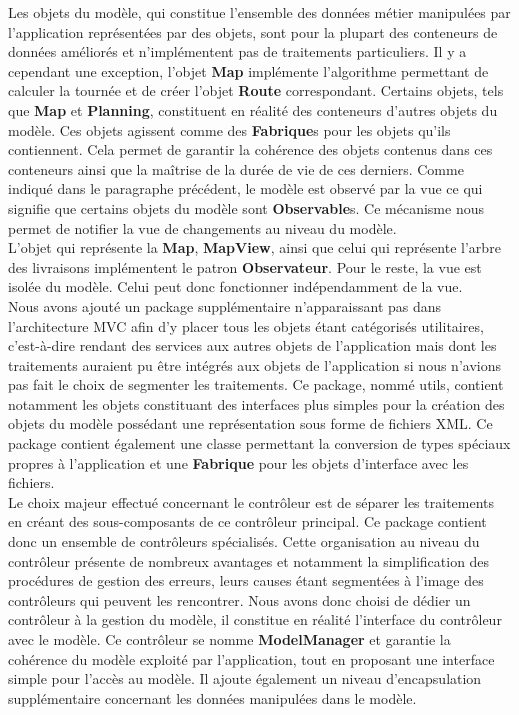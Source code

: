 \documentclass[paper=a4, fontsize=11pt]{report}
\numberwithin{equation}{section}		%
\numberwithin{figure}{section}		%
\numberwithin{table}{section}		%
\renewcommand{\bf}[1]{\textbf{#1}}
\begin{document}
Les objets du modèle, qui constitue l'ensemble des données métier manipulées par l'application représentées par des objets, sont pour la plupart des conteneurs de données améliorés et n'implémentent pas de traitements particuliers. Il y a cependant une exception, l'objet \bf{Map} implémente l'algorithme permettant de calculer la tournée et de créer l'objet \bf{Route} correspondant. Certains objets, tels que \bf{Map} et \bf{Planning}, constituent en réalité des conteneurs d'autres objets du modèle. Ces objets agissent comme des \bf{Fabrique}s pour les objets qu'ils contiennent. Cela permet de garantir la cohérence des objets contenus dans ces conteneurs ainsi que la maîtrise de la durée de vie de ces derniers. Comme indiqué dans le paragraphe précédent, le modèle est observé par la vue ce qui signifie que certains objets du modèle sont \bf{Observable}s. Ce mécanisme nous permet de notifier la vue de changements au niveau du modèle. \\

L'objet qui représente la \bf{Map}, \bf{MapView}, ainsi que celui qui représente l'arbre des livraisons implémentent le patron \bf{Observateur}. Pour le reste, la vue est isolée du modèle. Celui peut donc fonctionner indépendamment de la vue.\\

Nous avons ajouté un package supplémentaire n'apparaissant pas dans l'architecture MVC afin d'y placer tous les objets étant catégorisés utilitaires, c'est-à-dire rendant des services aux autres objets de l'application mais dont les traitements auraient pu être intégrés aux objets de l'application si nous n'avions pas fait le choix de segmenter les traitements. Ce package, nommé utils, contient notamment les objets constituant des interfaces plus simples pour la création des objets du modèle possédant une représentation sous forme de fichiers XML. Ce package contient également une classe permettant la conversion de types spéciaux propres à l'application et une \bf{Fabrique} pour les objets d'interface avec les fichiers. \\

Le choix majeur effectué concernant le contrôleur est de séparer les traitements en créant des sous-composants de ce contrôleur principal. Ce package contient donc un ensemble de  contrôleurs spécialisés. Cette organisation au niveau du contrôleur présente de nombreux avantages et notamment la simplification des procédures de gestion des erreurs, leurs causes étant segmentées à l'image des contrôleurs qui peuvent les rencontrer. 
Nous avons donc choisi de dédier un contrôleur à la gestion du modèle, il constitue en réalité l'interface du contrôleur avec le modèle. Ce contrôleur se nomme \bf{ModelManager} et garantie la cohérence du modèle exploité par l'application, tout en proposant une interface simple pour l'accès au modèle. Il ajoute également un niveau d'encapsulation supplémentaire concernant les données manipulées dans le modèle. 
\end{document}
